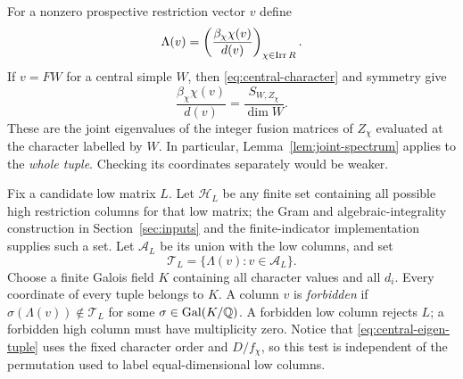For a nonzero prospective restriction vector $v$ define
\begin{equation}\label{eq:central-eigen-tuple}
 \Lambda(v)=
 \left(\frac{\beta_\chi\chi(v)}{d(v)}\right)_{\chi\in\operatorname{Irr} R}.
\end{equation}
If $v=FW$ for a central simple $W$, then
\eqref{eq:central-character} and symmetry give
\[
 \frac{\beta_\chi\chi(v)}{d(v)}
       =\frac{S_{W,Z_\chi}}{\dim W}.
\]
These are the joint eigenvalues of the integer fusion matrices of
$Z_\chi$ evaluated at the character labelled by $W$. In particular,
Lemma~\ref{lem:joint-spectrum} applies to the \emph{whole tuple}.
Checking its coordinates separately would be weaker.

Fix a candidate low matrix $L$. Let $\mathcal H_L$ be any finite set
containing all possible high restriction columns for that low matrix;
the Gram and algebraic-integrality construction in
Section~\ref{sec:inputs} and the finite-indicator implementation supplies
such a set. Let $\mathcal A_L$ be its union with the low columns, and set
\[
 \mathcal T_L=\{\Lambda(v):v\in\mathcal A_L\}.
\]
Choose a finite Galois field $K$ containing all character values and all
$d_i$. Every coordinate of every tuple belongs to $K$. A column $v$ is
\emph{forbidden} if $\sigma(\Lambda(v))\notin\mathcal T_L$ for some
$\sigma\in\operatorname{Gal}(K/\mathbb Q)$. A forbidden low column rejects
$L$; a forbidden high column must have multiplicity zero. Notice that
\eqref{eq:central-eigen-tuple} uses the fixed character order and
$D/f_\chi$, so this test is independent of the permutation used to
label equal-dimensional low columns.

